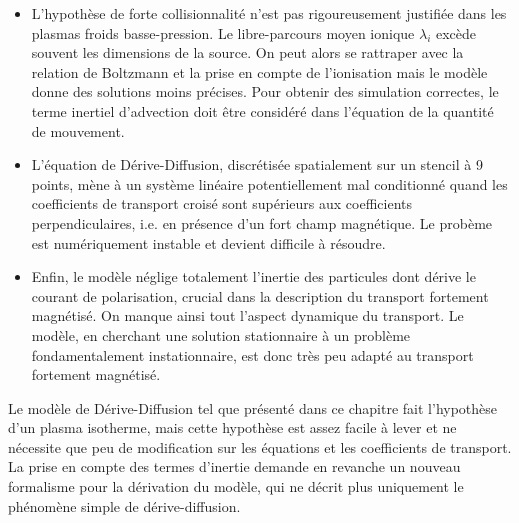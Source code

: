 \begin{refsection}
\begin{itemize}
  \item L'hypothèse de forte collisionnalité n'est pas rigoureusement justifiée
  dans les plasmas froids basse-pression. Le libre-parcours moyen ionique
  $\lambda_i$ excède souvent les dimensions de la source. On peut alors se
  rattraper avec la relation de Boltzmann et la prise en compte de l'ionisation
  mais le modèle donne des solutions moins précises. Pour obtenir des
  simulation correctes, le terme inertiel d'advection doit être considéré dans
  l'équation de la quantité de mouvement.
  \item L'équation de Dérive-Diffusion, discrétisée spatialement sur un
	stencil à 9 points, mène à un système linéaire potentiellement mal conditionné
	quand les coefficients de transport croisé sont supérieurs aux
	coefficients perpendiculaires, i.e. en présence d'un fort champ magnétique. Le
	probème est numériquement instable et devient difficile à résoudre. 
	\item Enfin, le modèle néglige totalement l'inertie des particules dont dérive
	le courant de polarisation, crucial dans la description du transport fortement
	magnétisé. On manque ainsi tout l'aspect dynamique du transport. Le
	modèle, en cherchant une solution stationnaire à un problème fondamentalement
	instationnaire, est donc très peu adapté au transport fortement magnétisé.
\end{itemize}

Le modèle de Dérive-Diffusion tel que présenté dans ce chapitre fait
l'hypothèse d'un plasma isotherme, mais cette hypothèse est assez facile à
lever et ne nécessite que peu de modification sur les équations et les
coefficients de transport. La prise en compte des termes d'inertie demande en
revanche un nouveau formalisme pour la dérivation du modèle, qui ne décrit plus
uniquement le phénomène simple de dérive-diffusion.

%
%
\end{refsection}

